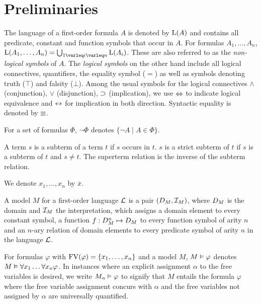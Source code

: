 \section{Preliminaries}
\label{sec:preliminaries}


The language of a first-order formula $A$ is denoted by $\operatorname{L}(A)$ and contains all predicate, constant and function symbols that occur in $A$.
For formulas $A_1, \ldots, A_n$, $\Lang(A_1, \ldots, A_n) = \bigcup_{1\varleq i \varleq n} \Lang(A_i)$.
These are also referred to as the \emph{\mbox{non-logical} symbols} of $A$.
The \emph{logical symbols} on the other hand include all logical connectives, quantifiers, the equality symbol ($=$) as well as symbols denoting truth ($\top$) and falsity ($\bot$).
Among the usual symbols for the logical connectives $\land$ (conjunction), $\lor$ (disjunction), $\operatorname{\supset}$ (implication), we use $\operatorname{\Leftrightarrow}$ to indicate logical equivalence and $\operatorname{\leftrightarrow}$ for implication in both direction.
Syntactic equality is denoted by $\equiv$.

For a set of formulas $\Phi$, $\lnot \Phi$ denotes $\{\lnot A \mid A \in \Phi\}$.


A term $s$ is a subterm of a term $t$ if $s$ occurs in $t$. $s$ is a strict subterm of $t$ if $s$ is a subterm of $t$ and $s \neq t$. The superterm relation is the inverse of the subterm relation.


We denote $x_1, \ldots, x_n$ by $\bar x$.


A model $M$ for a first-order language $\operatorname{\mathcal{L}}$ is a pair $(D_{M}, \mathcal{I}_{M})$, where $D_{M}$ is the domain and $\mathcal{I}_{M}$ the interpretation, which assigns a domain element to every constant symbol, a function $f : D_{M}^n \mapsto D_{M}$ to every function symbol of arity $n$ and an $n$-ary relation of domain elements to every predicate symbol of arity $n$ in the language $\operatorname{\mathcal{L}}$.

For formulas $\varphi$ with $\operatorname{FV}(\varphi) = \{x_1, \dots, x_n\}$ and a model $M$, $M\vDash \varphi$ denotes $M \vDash \forall x_1 \dots \forall x_n \varphi$.
In instances where an explicit assignment $\alpha$ to the free variables is desired,
we write $M_\alpha \vDash \varphi$ 
to signify that $M$ entails the formula $\varphi$ where the free variable assignment concurs with $\alpha$ and the free variables not assigned by $\alpha$ are universally quantified.


